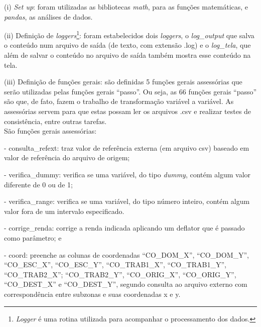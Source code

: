 \begin{compactitem}[]
\item (i) \textit{Set up}: foram utilizadas as bibliotecas \textit{math}, para as funções matemáticas, e \textit{pandas}, as análises de dados.\\

\item (ii) Definição de \textit{loggers}\footnote{\textit{Logger} é uma rotina utilizada para acompanhar o processamento dos dados.}: foram estabelecidos dois \textit{loggers}, o \textit{log_output} que salva o conteúdo num arquivo de saída (de texto, com extensão .log) e o \textit{log_tela}, que além de salvar o conteúdo no arquivo de saída também mostra esse conteúdo na tela.\\

\item (iii) Definição de funções gerais: são definidas 5 funções gerais assessórias que serão utilizadas pelas funções gerais ``passo”. Ou seja, as 66 funções gerais ``passo'' são que, de fato, fazem o trabalho de transformação variável a variável. As assessórias servem para que estas possam ler os arquivos .csv e realizar testes de consistência, entre outras tarefas.\\

São funções gerais assessórias:
\item - consulta_refext: traz valor de referência externa (em arquivo csv) baseado em valor de referência do arquivo de origem;
\item - verifica_dummy: verifica se uma variável, do tipo \textit{dummy}, contém algum valor diferente de 0 ou de 1; 
\item - verifica_range: verifica se uma variável, do tipo número inteiro, contém algum valor fora de um intervalo especificado.
\item - corrige_renda: corrige a renda indicada aplicando um deflator que é passado como parâmetro; e
\item - coord: preenche as colunas de coordenadas ``CO_DOM_X'', ``CO_DOM_Y'', ``CO_ESC_X'', ``CO_ESC_Y'', ``CO_TRAB1_X'', ``CO_TRAB1_Y'', ``CO_TRAB2_X''; ``CO_TRAB2_Y'', ``CO_ORIG_X'', ``CO_ORIG_Y'', ``CO_DEST_X'' e ``CO_DEST_Y'', segundo consulta ao arquivo externo com correspondência entre subzonas e suas coordenadas x e y.\\


\end{compactitem}
